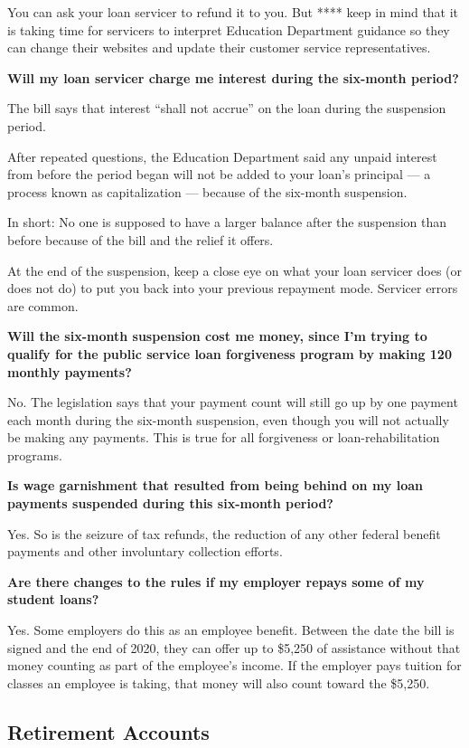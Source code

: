 You can ask your loan servicer to refund it to you. But **** keep in
mind that it is taking time for servicers to interpret Education
Department guidance so they can change their websites and update their
customer service representatives.

\textbf{Will my loan servicer charge me interest during the six-month
period?}

The bill says that interest ``shall not accrue'' on the loan during the
suspension period.

After repeated questions, the Education Department said any unpaid
interest from before the period began will not be added to your loan's
principal --- a process known as capitalization --- because of the
six-month suspension.

In short: No one is supposed to have a larger balance after the
suspension than before because of the bill and the relief it offers.

At the end of the suspension, keep a close eye on what your loan
servicer does (or does not do) to put you back into your previous
repayment mode. Servicer errors are common.

\textbf{Will the six-month suspension cost me money, since I'm trying to
qualify for the public service loan forgiveness program by making 120
monthly payments?}

No. The legislation says that your payment count will still go up by one
payment each month during the six-month suspension, even though you will
not actually be making any payments. This is true for all forgiveness or
loan-rehabilitation programs.

\textbf{Is wage garnishment that resulted from being behind on my loan
payments suspended during this six-month period?}

Yes. So is the seizure of tax refunds, the reduction of any other
federal benefit payments and other involuntary collection efforts.

\textbf{Are there changes to the rules if my employer repays some of my
student loans?}

Yes. Some employers do this as an employee benefit. Between the date the
bill is signed and the end of 2020, they can offer up to \$5,250 of
assistance without that money counting as part of the employee's income.
If the employer pays tuition for classes an employee is taking, that
money will also count toward the \$5,250.

\hypertarget{retirement-accounts}{%
\subsection{Retirement Accounts}\label{retirement-accounts}}

